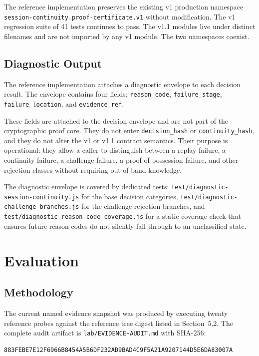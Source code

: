 \documentclass[11pt,a4paper]{article}
\begin{document}
The reference implementation preserves the existing v1 production namespace \texttt{session-continuity.proof-certificate.v1} without modification. The v1 regression suite of 41 tests continues to pass. The v1.1 modules live under distinct filenames and are not imported by any v1 module. The two namespaces coexist.

\subsection{Diagnostic Output}

The reference implementation attaches a diagnostic envelope to each decision result. The envelope contains four fields: \texttt{reason\_code}, \texttt{failure\_stage}, \texttt{failure\_location}, and \texttt{evidence\_ref}.

These fields are attached to the decision envelope and are not part of the cryptographic proof core. They do not enter \texttt{decision\_hash} or \texttt{continuity\_hash}, and they do not alter the v1 or v1.1 contract semantics. Their purpose is operational: they allow a caller to distinguish between a replay failure, a continuity failure, a challenge failure, a proof-of-possession failure, and other rejection classes without requiring out-of-band knowledge.

The diagnostic envelope is covered by dedicated tests: \texttt{test/diagnostic-session-continuity.js} for the base decision categories, \texttt{test/diagnostic-challenge-branches.js} for the challenge rejection branches, and \texttt{test/diagnostic-reason-code-coverage.js} for a static coverage check that ensures future reason codes do not silently fall through to an unclassified state.
\section{Evaluation}

\subsection{Methodology}

The current named evidence snapshot was produced by executing twenty reference probes against the reference tree digest listed in Section~5.2. The complete audit artifact is \texttt{lab/EVIDENCE-AUDIT.md} with SHA-256:

\begin{lstlisting}
883FEBE7E12F6966B8454A5B6DF232AD9BAD4C9F5A21A9207144D5E6DA83007A
\end{lstlisting}
\end{document}
